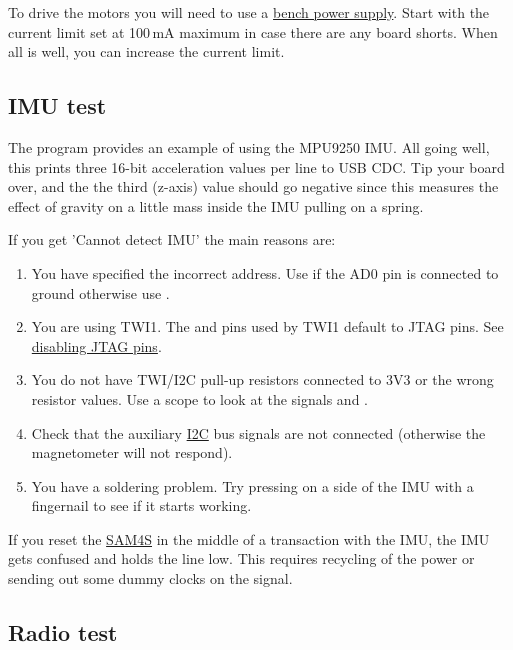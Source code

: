 To drive the motors you will need to use a
\href{bench_power_supply}{bench power supply}. Start with the current
limit set at 100\,mA maximum in case there are any board shorts.
When all is well, you can increase the current limit.

\subsection{IMU test}
\label{imu-test}

The program
\href{https://eng-git.canterbury.ac.nz/mph/wacky-racers-2021/blob/master/src/demo-apps/imu_test1/imu_test1.c}{}
provides an example of using the MPU9250 IMU.  All going well, this
prints three 16-bit acceleration values per line to USB CDC. Tip your
board over, and the the third (z-axis) value should go negative since
this measures the effect of gravity on a little mass inside the IMU
pulling on a spring.

If you get 'Cannot detect IMU' the main reasons are:

\begin{enumerate}
\item
  You have specified the incorrect address. Use  if the
  AD0 pin is connected to ground otherwise use .
\item
  You are using TWI1. The  and  pins used by TWI1 default to JTAG
  pins. See \protect\hyperref[disabling-jtag-pins]{disabling JTAG pins}.
\item
  You do not have TWI/I2C pull-up resistors connected to 3V3 or the
  wrong resistor values. Use a scope to look at the signals 
  and .
\item
  Check that the auxiliary \url{I2C} bus signals are not connected
  (otherwise the magnetometer will not respond).  
\item
  You have a soldering problem. Try pressing on a side of the IMU with a
  fingernail to see if it starts working.
\end{enumerate}

If you reset the \url{SAM4S} in the middle of a transaction with the
IMU, the IMU gets confused and holds the  line low. This
requires recycling of the power or sending out some dummy clocks on
the  signal.


\subsection{Radio test}
\label{radio-test}

